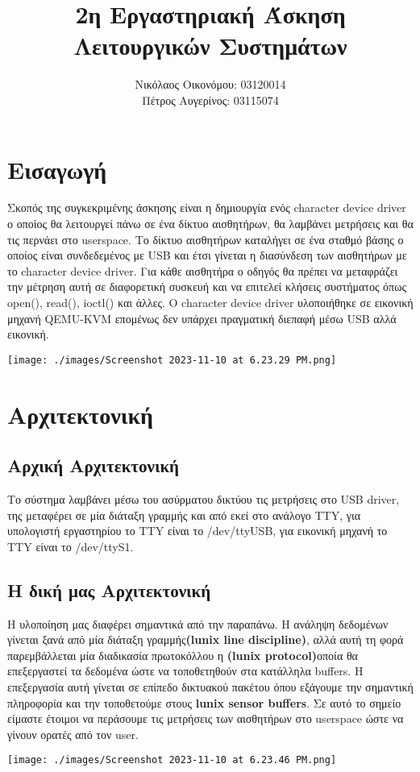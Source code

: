 \documentclass{article}
\title{2η Εργαστηριακή Άσκηση Λειτουργικών Συστημάτων}
\author{Νικόλαος Οικονόμου: 03120014 \\
        Πέτρος Αυγερίνος: 03115074}
\date{}
\begin{document}
\maketitle
\pagebreak
\section{Εισαγωγή} Σκοπός της συγκεκριμένης άσκησης είναι η δημιουργία ενός character device driver ο οποίος θα λειτουργεί
πάνω σε ένα δίκτυο αισθητήρων, θα λαμβάνει μετρήσεις και θα τις περνάει στο userspace. Το δίκτυο
αισθητήρων καταλήγει σε ένα σταθμό βάσης ο οποίος είναι συνδεδεμένος με USB και έτσι γίνεται η
διασύνδεση των αισθητήρων με το character device driver. Για κάθε αισθητήρα ο οδηγός θα πρέπει 
να μεταφράζει την μέτρηση αυτή σε διαφορετική συσκευή και να επιτελεί κλήσεις συστήματος όπως 
open(), read(), ioctl() και άλλες. Ο character device driver υλοποιήθηκε σε εικονική 
μηχανή QEMU-KVM επομένως δεν υπάρχει πραγματική διεπαφή μέσω USB αλλά εικονική. \\

\begin{center}
\texttt{[image: ./images/Screenshot 2023-11-10 at 6.23.29 PM.png]}
\end{center}
\section{Αρχιτεκτονική}
\subsection{Αρχική Αρχιτεκτονική}
Το σύστημα λαμβάνει μέσω του ασύρματου δικτύου τις μετρήσεις στο USB driver, της μεταφέρει σε μία
διάταξη γραμμής και από εκεί στο ανάλογο TTY, για υπολογιστή εργαστηρίου το TTY είναι το /dev/ttyUSB,
για εικονική μηχανή το TTY είναι το /dev/ttyS1. \\
\subsection{Η δική μας Αρχιτεκτονική}
Η υλοποίηση μας διαφέρει σημαντικά από την παραπάνω. Η ανάληψη δεδομένων γίνεται ξανά από μία διάταξη
γραμμής\textbf{(lunix line discipline)}, αλλά αυτή τη φορά παρεμβάλλεται μία διαδικασία πρωτοκόλλου
η \textbf{(lunix protocol)}οποία θα επεξεργαστεί τα δεδομένα ώστε να τοποθετηθούν στα κατάλληλα buffers.
Η επεξεργασία αυτή γίνεται σε επίπεδο δικτυακού πακέτου όπου εξάγουμε την σημαντική πληροφορία και την
τοποθετούμε στους \textbf{lunix sensor buffers}. Σε αυτό το σημείο είμαστε έτοιμοι να περάσουμε τις 
μετρήσεις των αισθητήρων στο userspace ώστε να γίνουν ορατές από τον user. 
\begin{center}
\texttt{[image: ./images/Screenshot 2023-11-10 at 6.23.46 PM.png]}
\end{center}
\pagebreak
\end{document}
